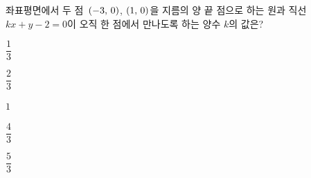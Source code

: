 좌표평면에서 두 점~$(-3,\mkern3mu 0)$, $(1,\mkern3mu 0)$을 지름의 양 끝 점으로 하는 원과 직선~$kx+y-2=0$이 오직 한 점에서 만나도록 하는 양수 $k$의 값은?
\begin{choices32}{\rule[-3ex]{0pt}{8ex}$\dfrac{1}{3}$}{\rule[-3ex]{0pt}{8ex}$\dfrac{2}{3}$}{\rule[-3ex]{0pt}{8ex}$1$}{\rule[-3ex]{0pt}{8ex}$\dfrac{4}{3}$}{\rule[-3ex]{0pt}{8ex}$\dfrac{5}{3}$}\end{choices32}
